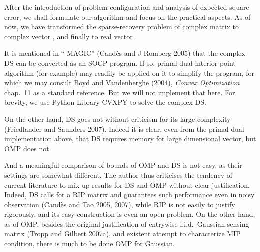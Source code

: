 \startchapter [title={Simulation}]

After the introduction of problem configuration and analysis of expected square error, we shall formulate our algorithm and focus on the practical aspects.
As of now, we have transformed the sparse-recovery problem of complex matrix  to complex vector , and finally to real vector .

It is mentioned in ``-MAGIC'' (Cand\`es and J Romberg 2005) that the complex DS can be converted as an SOCP program.
If so, primal-dual interior point algorithm (for example) may readily be applied on it to simplify the program, for which we may consult Boyd and Vandenberghe (2004), {\it Convex Optimization} chap.\ 11 as a standard reference.
But we will not implement that here.
For brevity, we use Python Library CVXPY to solve the complex DS.


\startsection [title={Parameters}]



\stopsection



\startsection [title={Discussion}]

On the other hand, DS goes not without criticism for its large complexity (Friedlander and Saunders 2007).
Indeed it is clear, even from the primal-dual implementation above, that DS requires memory for large dimensional vector, but OMP does not.

And a meaningful comparison of bounds of OMP and DS is not easy, as their settings are somewhat different.
The author thus criticises the tendency of current literature to mix up results for DS and OMP without clear justification.
Indeed, DS calls for a RIP matrix and guarantees such performance even in noisy observation (Cand\`es and Tao 2005, 2007), while RIP is not easily to justify rigorously, and its easy construction is even an open problem.
On the other hand, as of OMP, besides the original justification of entrywise i.i.d.\ Gaussian sensing matrix (Tropp and Gilbert 2007a), and existent attempt to characterize MIP condition, there is much to be done OMP for Gaussian.

\stopsection

\stopchapter
